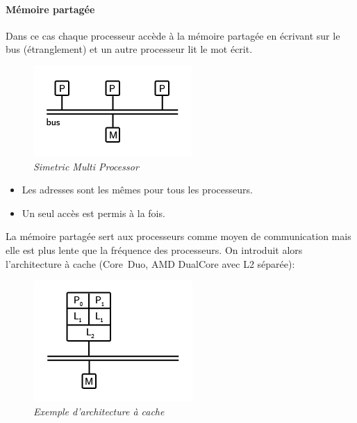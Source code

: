 \documentclass[12pt, a4paper]{article}
\begin{document}
        \paragraph{Mémoire partagée} Dans ce cas chaque processeur accède à la
        mémoire partagée en écrivant sur le bus (étranglement) et un autre
        processeur lit le mot écrit.
        \begin{figure}[!ht]
          \centering
          \includegraphics{images/shmem.png}
          \caption{\textit{Simetric Multi Processor}}
          \label{fig:smp}
        \end{figure}
        \begin{itemize}
          \item Les adresses sont les mêmes pour tous les processeurs.
          \item  Un seul accès est permis à la fois.
        \end{itemize}
        La mémoire partagée sert aux processeurs comme moyen de communication
        mais elle est plus lente que la fréquence des processeurs. On introduit
        alors l'architecture à cache (Core\texttrademark\ Duo, AMD DualCore avec
         L2 séparée):
        \begin{figure}[!ht]
         \centering
         \includegraphics{images/shmc.png}
         \caption{\textit{Exemple d'architecture à cache}}
         \label{fig:shmc}
        \end{figure}
\end{document}
